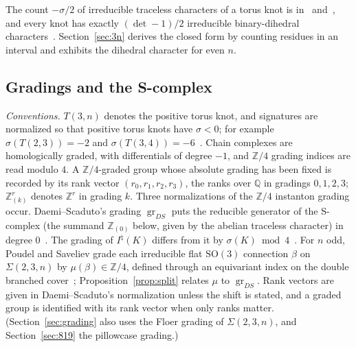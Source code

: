 \documentclass[11pt,reqno]{amsart}
\theoremstyle{plain}
\theoremstyle{definition}
\newcommand{\Z}{\mathbb{Z}}
\newcommand{\SO}{\mathrm{SO}(3)}
\newcommand{\Inat}{I^{\natural}}
\newcommand{\gr}{\operatorname{gr}}
\newcommand{\Sig}{\Sigma}
\begin{document}
The count $-\sigma/2$ of irreducible traceless characters of a torus knot is in~\cite[\S5.1]{HHK1}
and~\cite[\S9.5]{DSEquiv}, and every knot has exactly $(\det-1)/2$ irreducible binary-dihedral
characters~\cite[Thm.~10]{Klassen}. Section~\ref{sec:3n} derives the closed form by counting residues in
an interval and exhibits the dihedral character for even $n$.

\subsection{Gradings and the S-complex}\label{sec:intro-scx}
\emph{Conventions.} $T(3,n)$ denotes the positive torus knot, and signatures are
normalized so that positive torus knots have $\sigma<0$; for example $\sigma(T(2,3))=-2$ and
$\sigma(T(3,4))=-6$~\cite[(9.38)]{DSEquiv}. Chain complexes are homologically graded, with differentials
of degree $-1$, and $\Z/4$ grading indices are read modulo $4$. A $\Z/4$-graded group whose absolute
grading has been fixed is recorded by its rank vector $(r_0,r_1,r_2,r_3)$, the ranks over $\mathbb Q$ in
gradings $0,1,2,3$; $\Z^r_{(k)}$ denotes $\Z^r$ in grading $k$. Three normalizations of the $\Z/4$
instanton grading occur. Daemi--Scaduto's grading $\gr_{DS}$ puts the reducible generator of the S-complex (the summand $\Z_{(0)}$
below, given by the abelian traceless character) in degree $0$~\cite[(2.18), Def.~3.21]{DSEquiv}. The grading of $\Inat(K)$ differs from it by
$\sigma(K)\bmod4$~\cite[Thm.~8.9]{DSEquiv}. For $n$ odd, Poudel and Saveliev grade each irreducible flat
$\SO$ connection $\beta$ on $\Sig(2,3,n)$ by $\mu(\beta)\in\Z/4$, defined through an equivariant index on
the double branched cover~\cite[Prop.~6.5]{PS}; Proposition~\ref{prop:split} relates $\mu$ to
$\gr_{DS}$. Rank vectors are given in Daemi--Scaduto's normalization unless the shift is stated, and a graded group
is identified with its rank vector when only ranks matter. (Section~\ref{sec:grading} also uses the
Floer grading of $\Sig(2,3,n)$, and Section~\ref{sec:819} the pillowcase grading.)
\end{document}
